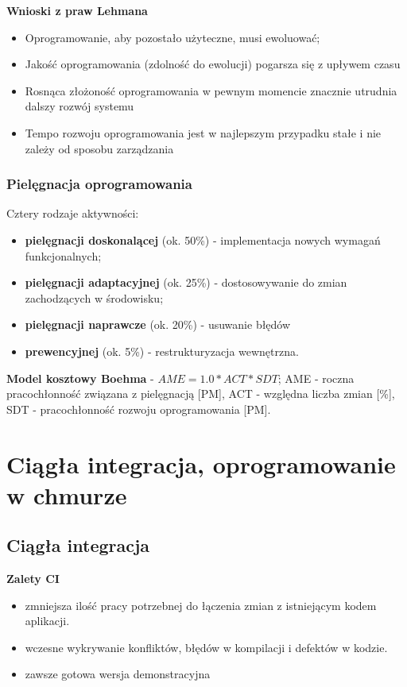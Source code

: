 \documentclass[a4paper]{article}
\begin{document}
    \textbf{Wnioski z praw Lehmana}
    \begin{itemize}
        \item Oprogramowanie, aby pozostało użyteczne, musi ewoluować;
        \item Jakość oprogramowania (zdolność do ewolucji) pogarsza się z upływem czasu
        \item Rosnąca złożoność oprogramowania w pewnym momencie znacznie utrudnia dalszy rozwój systemu
        \item Tempo rozwoju oprogramowania jest w najlepszym przypadku stałe i nie zależy od
        sposobu zarządzania
    \end{itemize}

    \subsubsection{Pielęgnacja oprogramowania}
    Cztery rodzaje aktywności:
    \begin{itemize}
        \item \textbf{pielęgnacji doskonalącej} (ok. 50\%) - implementacja nowych wymagań
        funkcjonalnych;
        \item \textbf{pielęgnacji adaptacyjnej} (ok. 25\%) -  dostosowywanie do zmian zachodzących w środowisku;
        \item \textbf{pielęgnacji naprawcze} (ok. 20\%) - usuwanie błędów
        \item \textbf{prewencyjnej} (ok. 5\%) - restrukturyzacja wewnętrzna.
    \end{itemize}

    \textbf{Model kosztowy Boehma} - $AME = 1.0 * ACT * SDT$; AME - roczna pracochłonność związana
    z pielęgnacją [PM], ACT - względna liczba zmian [\%], SDT - pracochłonność rozwoju oprogramowania [PM].


    \section{Ciągła integracja, oprogramowanie w chmurze}

        \subsection{Ciągła integracja}

                    \textbf{Zalety CI}
                    \begin{itemize}
                        \item zmniejsza ilość pracy potrzebnej do łączenia zmian
                        z istniejącym kodem aplikacji.
                        \item wczesne wykrywanie konfliktów, błędów w
                        kompilacji i defektów w kodzie.
                        \item zawsze gotowa wersja demonstracyjna
                    \end{itemize}
\end{document}
